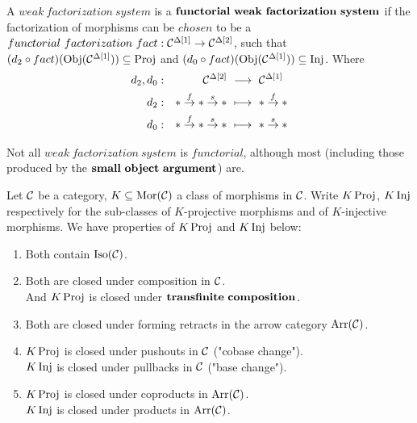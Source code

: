     \begin{defn} 
        A $weak\ factorization\ system$ is a $\mbf{functorial\ weak\ factorization\ system}$
        if the factorization of morphisms can be $chosen$ to be a $functorial\ factorization\ fact : \mathcal{C}^{\Delta[1]} \to \mathcal{C}^{\Delta[2]}$,
        such that $(d_2 \circ fact) (\operatorname{\rm{Obj}}(\mathcal{C}^{\Delta[1]})) \subseteq \operatorname{\rm{Proj}}$ and $(d_0 \circ fact) (\operatorname{\rm{Obj}}(\mathcal{C}^{\Delta[1]})) \subseteq \operatorname{\rm{Inj}}$.
        Where
        \begin{align*}
            d_2, d_0 &: &\mathcal{C}^{\Delta[2]} &\ \longrightarrow \ \mathcal{C}^{\Delta[1]}\\
            d_2 &: &\ast \overset{f}{\to} \ast \overset{s}{\to} \ast
                &\ \longmapsto \ \ast \overset{f}{\to} \ast\\
            d_0 &: &\ast \overset{f}{\to} \ast \overset{s}{\to} \ast
                &\ \longmapsto \ \ast \overset{s}{\to} \ast
        \end{align*}

    \end{defn}

    \begin{note}
        Not all $weak\ factorization\ system$ is $functorial$,
        although most (including those produced by the $\mathbf{small\ object\ argument}$) are.
    \end{note}

    \begin{prop}
        Let $\mathcal{C}$ be a category, $K \subseteq \operatorname{\rm{Mor}}(\mathcal{C})$ a class of morphisms in $\mathcal{C}$.
        Write $K \operatorname{\rm{Proj}}$, $K \operatorname{\rm{Inj}}$ respectively for
        the sub-classes of $K$-projective morphisms
        and of $K$-injective morphisms.
        We have properties of $K \operatorname{\rm{Proj}}$ and $K \operatorname{\rm{Inj}}$ below:
        \begin{enumerate}
            \item Both contain $\operatorname{\rm{Iso}}(\mathcal{C})$.
            \item Both are closed under composition in $\mathcal{C}$.\\
                And $K \operatorname{\rm{Proj}}$ is closed under $\mathbf{transfinite\ composition}$.
            \item Both are closed under forming retracts in the arrow category $\operatorname{\rm{Arr}}(\mathcal{C})$.
            \item $K \operatorname{\rm{Proj}}$ is closed under pushouts in $\mathcal{C}$ ("cobase change").\\
                $K \operatorname{\rm{Inj}}$ is closed under pullbacks in $\mathcal{C}$ ("base change").
            \item $K \operatorname{\rm{Proj}}$ is closed under coproducts in $\operatorname{\rm{Arr}}(\mathcal{C})$.\\
                $K \operatorname{\rm{Inj}}$ is closed under products in $\operatorname{\rm{Arr}}(\mathcal{C})$.
        \end{enumerate}
    \end{prop}


